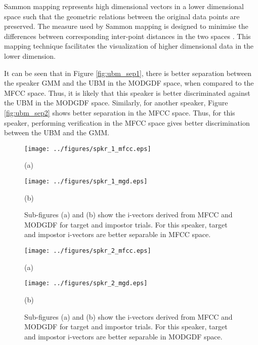 \documentclass[preprint,12pt,5p]{elsarticle}
\begin{document}
Sammon mapping represents high dimensional vectors in a 
lower dimensional space such that the geometric relations between the original data points
are preserved. The measure used by Sammon mapping is designed to 
minimise the differences between corresponding inter-point distances in the two spaces 
\cite{sammon1}. This mapping technique facilitates the visualization of higher dimensional data
in the lower dimension. 

It can be seen that in Figure \ref{fig:ubm_sep1}, there is  better separation
between the speaker GMM and the UBM in the MODGDF space, when compared to the MFCC
space. Thus, it is likely that this speaker is better discriminated against the
UBM in the MODGDF space. Similarly, for another speaker, Figure
\ref{fig:ubm_sep2} shows better separation in the MFCC space. Thus, for this
speaker, performing verification in the MFCC space gives better discrimination
between the UBM and the GMM. 

\begin{figure}[h!tb]
\centering 
\begin{minipage}{0.5\textwidth}
\centering 
\texttt{[image: ../figures/spkr\_1\_mfcc.eps]}
\caption*{(a)}
\label{fig:subfig3}
\end{minipage}
\begin{minipage}{0.5\textwidth}
\centering 
\vspace{3mm}
\texttt{[image: ../figures/spkr\_1\_mgd.eps]}
\caption*{(b)}
\label{fig:subfig4}
\end{minipage}
\caption{Sub-figures (a) and (b) show the i-vectors derived from MFCC
and MODGDF for target and impostor trials. For this speaker, target and impostor
i-vectors are better separable in MFCC space.}
\label{fig:ivec_separation1}
\end{figure}

\begin{figure}[h!tb]
\centering 
\begin{minipage}{0.5\textwidth}
\centering 
\texttt{[image: ../figures/spkr\_2\_mfcc.eps]}
\caption*{(a)}
\label{fig:subfig5}
\end{minipage}
\begin{minipage}{0.5\textwidth}
\centering 
\vspace{3mm}
\texttt{[image: ../figures/spkr\_2\_mgd.eps]}
\caption*{(b)}
\label{fig:subfig6}
\end{minipage}
\caption{Sub-figures (a) and (b) show the i-vectors derived from MFCC
and MODGDF for target and impostor trials. For this speaker, target and impostor
i-vectors are better separable in MODGDF space.}
\label{fig:ivec_separation2}
\end{figure}
\end{document}

